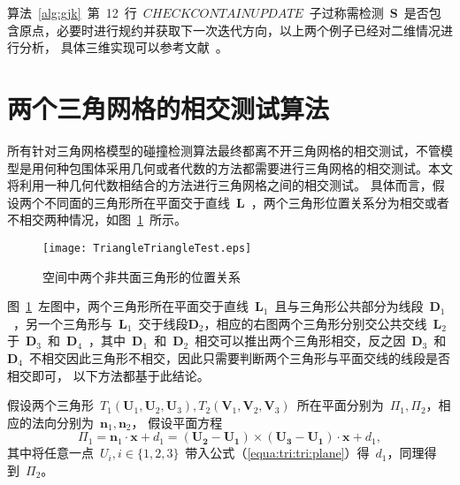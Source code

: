 算法~\ref{alg:gjk}~第~12~行~$CHECKCONTAINUPDATE$~子过称需检测~$\bm{S}$~是否包含原点，必要时进行规约并获取下一次迭代方向，以上两个例子已经对二维情况进行分析，
具体三维实现可以参考文献~。

\FloatBarrier
\section{两个三角网格的相交测试算法}
\label{sec:intersection:triangles}

所有针对三角网格模型的碰撞检测算法最终都离不开三角网格的相交测试，不管模型是用何种包围体采用几何或者代数的方法都需要进行三角网格的相交测试。本文将利用一种几何代数相结合的方法进行三角网格之间的相交测试。
具体而言，假设两个不同面的三角形所在平面交于直线~$\bm{L}$~，两个三角形位置关系分为相交或者不相交两种情况，如图~\ref{fig:two:triangle:ui}~所示。

\begin{figure}[!ht]
  \centering
    \texttt{[image: TriangleTriangleTest.eps]}
    \caption{空间中两个非共面三角形的位置关系\cite{Moller1997}}
  \label{fig:two:triangle:ui}
\end{figure}

图~\ref{fig:two:triangle:ui}~左图中，两个三角形所在平面交于直线~$\bm{L}_1$~且与三角形公共部分为线段~$\bm{D}_1$~，另一个三角形与~$\bm{L}_1$~交于线段$\bm{D}_2$，相应的右图两个三角形分别交公共交线~$\bm{L}_2$~
于~$\bm{D}_3$~和~$\bm{D}_4$~，其中~$\bm{D}_1$~和~$\bm{D}_2$~相交可以推出两个三角形相交，反之因~$\bm{D}_3$~和~$\bm{D}_4$~不相交因此三角形不相交，因此只需要判断两个三角形与平面交线的线段是否相交即可\cite{Moller1997}，
以下方法都基于此结论。

假设两个三角形~$T_1(\bm{U}_1,\bm{U}_2,\bm{U}_3), T_2(\bm{V}_1,\bm{V}_2,\bm{V}_3)$~所在平面分别为~$\Pi_1, \Pi_2$，相应的法向分别为~$\bm{n}_1, \bm{n}_2$，
假设平面方程~
\begin{equation}
  \Pi_1 = \bm{n}_1 \cdot \bm{x}+d_1 = (\bm{U_2} - \bm{U_1}) \times (\bm{U_3}-\bm{U_1})  \cdot \bm{x} + d_1,
\label{equa:tri:tri:plane}
\end{equation}
其中将任意一点~$U_i, i \in \{1,2,3\}$~带入公式（\ref{equa:tri:tri:plane}）得~$d_1$，同理得到~$\Pi_2$。

